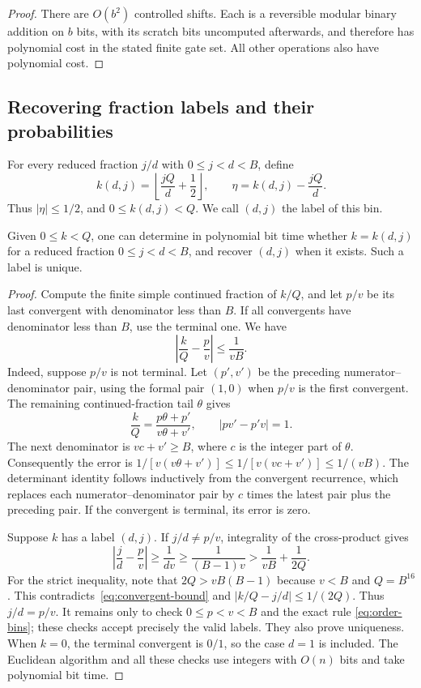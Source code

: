 \begin{proof}
There are $O(b^2)$ controlled shifts.  Each is a reversible modular
binary addition on $b$ bits, with its scratch bits uncomputed afterwards,
and therefore has polynomial cost in the stated finite gate set.  All
other operations also have polynomial cost.
\end{proof}

\subsection{Recovering fraction labels and their probabilities}

For every reduced fraction $j/d$ with $0\le j<d<B$, define
\begin{equation}\label{eq:order-bins}
 k(d,j)=\left\lfloor\frac{jQ}{d}+\frac12\right\rfloor,
 \qquad
 \eta=k(d,j)-\frac{jQ}{d}.
\end{equation}
Thus $|\eta|\le1/2$, and $0\le k(d,j)<Q$.
We call $(d,j)$ the label of this bin.

\begin{lemma}\label{lem:bins}
Given $0\le k<Q$, one can determine in polynomial bit time whether
$k=k(d,j)$ for a reduced fraction $0\le j<d<B$, and recover $(d,j)$
when it exists.  Such a label is unique.
\end{lemma}

\begin{proof}
Compute the finite simple continued fraction of $k/Q$, and let $p/v$ be
its last convergent with denominator less than $B$.  If all convergents
have denominator less than $B$, use the terminal one.  We have
\begin{equation}\label{eq:convergent-bound}
 \left|\frac{k}{Q}-\frac pv\right|\le\frac1{vB}.
\end{equation}
Indeed, suppose $p/v$ is not terminal.  Let $(p',v')$ be the preceding
numerator--denominator pair, using the formal pair $(1,0)$ when $p/v$
is the first convergent.  The remaining continued-fraction tail $\theta$
gives
\[
 \frac{k}{Q}=\frac{p\theta+p'}{v\theta+v'},
 \qquad |pv'-p'v|=1.
\]
The next denominator is $v c+v'\ge B$, where $c$ is the integer part of
$\theta$.  Consequently the error is
$1/[v(v\theta+v')]\le1/[v(vc+v')]\le1/(vB)$.
The determinant identity follows inductively from the convergent
recurrence, which replaces each numerator--denominator pair by $c$
times the latest pair plus the preceding pair.  If the convergent is
terminal, its error is zero.

Suppose $k$ has a label $(d,j)$.  If $j/d\ne p/v$, integrality of the
cross-product gives
\[
 \left|\frac jd-\frac pv\right|
 \ge\frac1{dv}\ge\frac1{(B-1)v}
 >\frac1{vB}+\frac1{2Q}.
\]
For the strict inequality, note that
$2Q>vB(B-1)$ because $v<B$ and $Q=B^{16}$.
This contradicts~\eqref{eq:convergent-bound} and
$|k/Q-j/d|\le1/(2Q)$.  Thus $j/d=p/v$.
It remains only to check $0\le p<v<B$ and the exact rule
\eqref{eq:order-bins}; these checks accept precisely the valid labels.
They also prove uniqueness.  When $k=0$, the terminal convergent is
$0/1$, so the case $d=1$ is included.
The Euclidean algorithm and all these checks use integers with $O(n)$
bits and take polynomial bit time.
\end{proof}

